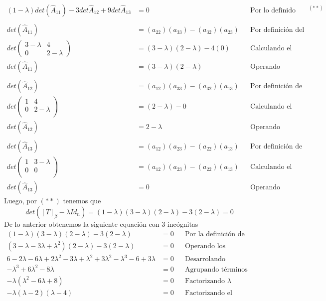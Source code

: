 \documentclass[letterpaper]{article}
\renewcommand{\*}{\cdot}
\theoremstyle{definition}
\begin{document}
\begin{align*}
(1- \lambda)det(\hat{A}_{11}) - 3det\hat{A}_{12} + 9det\hat{A}_{13} &= 0 && \text{Por lo definido anteriormente}^{(**)}\\
\\
det(\hat{A}_{11}) & = (a_{22})(a_{33}) - (a_{32})(a_{23})  && \text{Por definición del determinante en 2x2}\\
det\begin{pmatrix}
3 - \lambda & 4\\
0 & 2 - \lambda
\end{pmatrix} & = (3 - \lambda) ( 2- \lambda) - 4(0) && \text{Calculando el determinante del menor}\\
det(\hat{A}_{11})& = (3 - \lambda) ( 2-\lambda) && \text{Operando}\\
\\
det(\hat{A}_{12}) & = (a_{12})(a_{33}) - (a_{32})(a_{13})  && \text{Por definición de determinante en 2x2}\\
det\begin{pmatrix}
1 & 4 \\
0 & 2-\lambda \\
\end{pmatrix}  &= (2- \lambda)- 0 && \text{Calculando el determinante del menor}\\
det(\hat{A}_{12}) & = 2-\lambda  && \text{Operando}\\
\\
det(\hat{A}_{13}) & = (a_{12})(a_{23}) - (a_{22})(a_{13})  && \text{Por definición de determinante en 2x2}\\
det\begin{pmatrix}
1 & 3 - \lambda\\
0 & 0\\
\end{pmatrix} & = (a_{12})(a_{23}) - (a_{22})(a_{13})  && \text{Calculando el determinante del menor}\\
det(\hat{A}_{13}) & = 0 && \text{Operando}
\end{align*}
Luego, por $ (**) $ tenemos que $$ det([T]_{\beta} - \lambda Id_n) = (1-\lambda)(3-\lambda)(2-\lambda) - 3(2-\lambda) = 0 $$  
De lo anterior obtenemos la siguiente equación con 3 incógnitas
\begin{align*}
	(1-\lambda)(3-\lambda)(2-\lambda) - 3(2-\lambda) &= 0 && \text{Por la definición de determinante}\\
	(3-\lambda-3\lambda+\lambda^2)(2-\lambda) - 3(2-\lambda) &= 0 && \text{Operando los primeros miembros}\\
	6-2\lambda-6\lambda+2\lambda^2-3\lambda+\lambda^2+3\lambda^2-\lambda^3 -6+3\lambda &= 0 && \text{Desarrolando }\\
	-\lambda^3 + 6 \lambda^2 - 8\lambda&= 0 && \text{Agrupando términos semejantes }\\
	-\lambda  ( \lambda^2 - 6 \lambda + 8)&= 0 && \text{Factorizando } \lambda\\
	-\lambda  ( \lambda-2)(\lambda-4)&= 0 && \text{Factorizando el trinomio }\\
\end{align*}
\end{document}
